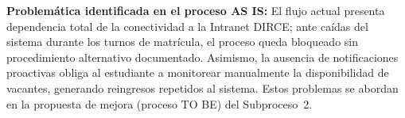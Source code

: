 \noindent
\textbf{Problemática identificada en el proceso AS IS:} El flujo actual presenta
dependencia total de la conectividad a la Intranet DIRCE; ante caídas del sistema
durante los turnos de matrícula, el proceso queda bloqueado sin procedimiento
alternativo documentado. Asimismo, la ausencia de notificaciones proactivas obliga al
estudiante a monitorear manualmente la disponibilidad de vacantes, generando reingresos
repetidos al sistema. Estos problemas se abordan en la propuesta de mejora (proceso
TO BE) del Subproceso~2.

